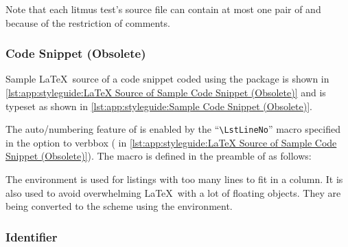 Note that each litmus test's source file can contain at most one
pair of \co{\\begin[snippet]} and \co{\\end[snippet]} because of
the restriction of comments.

\subsubsection{Code Snippet (Obsolete)}
\label{sec:app:styleguide:Code Snippet (Obsolete)}

Sample \LaTeX\ source of a code snippet coded using
the  package is shown in
\cref{lst:app:styleguide:LaTeX Source of Sample Code Snippet (Obsolete)}
and is typeset as shown in
\cref{lst:app:styleguide:Sample Code Snippet (Obsolete)}.

\begin{listing}
\begin{fcvlabel}
\end{fcvlabel}
\vspace*{-9pt}
\caption{\LaTeX\ Source of Sample Code Snippet (Obsolete)}
\label{lst:app:styleguide:LaTeX Source of Sample Code Snippet (Obsolete)}
\end{listing}



The auto\-/numbering feature of  is enabled by
the ``\verb|\LstLineNo|'' macro specified in the option to verbbox
( in
\cref{lst:app:styleguide:LaTeX Source of Sample Code Snippet (Obsolete)}).
The macro is defined in the preamble of 
as follows:

\begin{VerbatimU}
\newcommand{\LstLineNo}
  {\makebox[5ex][r]{\arabic{VerbboxLineNo}\hspace{2ex}}}
\end{VerbatimU}

The  environment is used for listings with too many lines
to fit in a column.
It is also used to avoid overwhelming \LaTeX\ with a lot of floating objects.
They are being converted to the scheme using the  environment.

\subsubsection{Identifier}
\label{sec:app:styleguide:Identifier}

